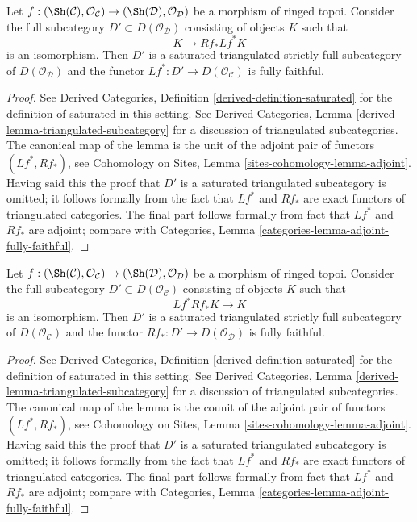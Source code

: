 \begin{lemma}
\label{lemma-downstairs}
Let $f : (\Sh(\mathcal{C}), \mathcal{O}_\mathcal{C}) \to
(\Sh(\mathcal{D}), \mathcal{O}_\mathcal{D})$ be a morphism of ringed topoi.
Consider the full subcategory $D' \subset D(\mathcal{O}_\mathcal{D})$
consisting of objects $K$ such that
$$
K \longrightarrow Rf_*Lf^*K
$$
is an isomorphism. Then $D'$ is a saturated triangulated strictly full
subcategory of $D(\mathcal{O}_\mathcal{D})$ and the functor
$Lf^* : D' \to D(\mathcal{O}_\mathcal{C})$ is fully faithful.
\end{lemma}

\begin{proof}
See Derived Categories, Definition \ref{derived-definition-saturated}
for the definition of saturated in this setting. See
Derived Categories, Lemma \ref{derived-lemma-triangulated-subcategory}
for a discussion of triangulated subcategories.
The canonical map of the lemma is the unit of the adjoint
pair of functors $(Lf^*, Rf_*)$, see
Cohomology on Sites, Lemma \ref{sites-cohomology-lemma-adjoint}.
Having said this the proof that $D'$ is a saturated triangulated subcategory
is omitted; it follows formally from the fact that
$Lf^*$ and $Rf_*$ are exact functors of triangulated categories.
The final part follows formally from
fact that $Lf^*$ and $Rf_*$ are adjoint; compare with
Categories, Lemma \ref{categories-lemma-adjoint-fully-faithful}.
\end{proof}

\begin{lemma}
\label{lemma-upstairs}
Let $f : (\Sh(\mathcal{C}), \mathcal{O}_\mathcal{C}) \to
(\Sh(\mathcal{D}), \mathcal{O}_\mathcal{D})$ be a morphism of ringed topoi.
Consider the full subcategory $D' \subset D(\mathcal{O}_\mathcal{C})$
consisting of objects $K$ such that
$$
Lf^*Rf_*K \longrightarrow K
$$
is an isomorphism. Then $D'$ is a saturated triangulated strictly full
subcategory of $D(\mathcal{O}_\mathcal{C})$ and the functor
$Rf_* : D' \to D(\mathcal{O}_\mathcal{D})$ is fully faithful.
\end{lemma}

\begin{proof}
See Derived Categories, Definition \ref{derived-definition-saturated}
for the definition of saturated in this setting. See
Derived Categories, Lemma \ref{derived-lemma-triangulated-subcategory}
for a discussion of triangulated subcategories.
The canonical map of the lemma is the counit of the adjoint
pair of functors $(Lf^*, Rf_*)$, see
Cohomology on Sites, Lemma \ref{sites-cohomology-lemma-adjoint}.
Having said this the proof that $D'$ is a saturated triangulated subcategory
is omitted; it follows formally from the fact that
$Lf^*$ and $Rf_*$ are exact functors of triangulated categories.
The final part follows formally from
fact that $Lf^*$ and $Rf_*$ are adjoint; compare with
Categories, Lemma \ref{categories-lemma-adjoint-fully-faithful}.
\end{proof}

